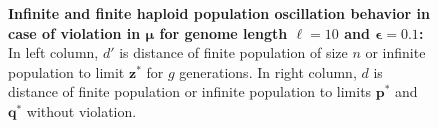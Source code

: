 \begin{figure}[h]
\begin{center}
\hspace{-3em}%
\vspace{-0.5em} \hspace{-3em}%


\caption[\textbf{Infinite and finite haploid population oscillation behavior in case of violation in $\bm{\mu}$ for genome length $\ell = 10$ and $\bm{\epsilon} = 0.1$}]{\textbf{Infinite and finite haploid population oscillation behavior in case of violation in $\bm{\mu}$ for genome length $\ell = 10$ and $\bm{\epsilon} = 0.1$:} 
  In left column, $d'$ is distance of finite population of size $n$ or infinite population to limit $\bm{z}^\ast$ for $g$ generations. In right column, $d$ is distance of finite population or infinite population to limits $\bm{p}^\ast$ and $\bm{q}^\ast$ without violation.}
\label{oscillation_10h_vio_mu_0.1}
\end{center}
\end{figure}

